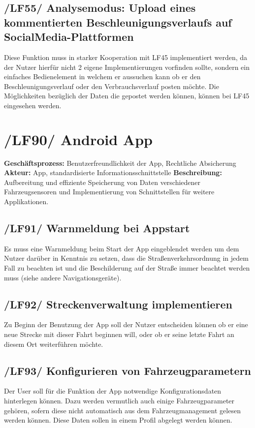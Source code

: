 \subsection{/LF55/ Analysemodus: Upload eines kommentierten Beschleunigungsverlaufs auf SocialMedia-Plattformen}
\newline
Diese Funktion muss in starker Kooperation mit LF45 implementiert werden, da der Nutzer hierfür nicht 2 eigene Implementierungen vorfinden sollte, sondern ein einfaches Bedienelement in welchem er aussuchen kann ob er den Beschleunigungsverlauf oder den Verbrauchsverlauf posten möchte. Die Möglichkeiten bezüglich der Daten die gepostet werden können, können bei LF45 eingesehen werden.

\newpage
\section{/LF90/ Android App}
\textbf{Geschäftsprozess:}	Benutzerfreundlichkeit der App, Rechtliche Absicherung
\newline
\textbf{Akteur:}		App, standardisierte Informationsschnittstelle
\newline
\textbf{Beschreibung:} Aufbereitung und effiziente Speicherung von Daten verschiedener Fahrzeugsensoren und Implementierung von Schnittstellen für weitere Applikationen. 

\subsection{/LF91/ Warnmeldung bei Appstart}
\newline
Es muss eine Warnmeldung beim Start der App eingeblendet werden um dem Nutzer darüber in Kenntnis zu setzen, dass die Straßenverkehrsordnung in jedem Fall zu beachten ist und die Beschilderung auf der Straße immer beachtet werden muss (siehe andere Navigationsgeräte).

\subsection{/LF92/ Streckenverwaltung implementieren}
\newline
Zu Beginn der Benutzung der App soll der Nutzer entscheiden können ob er eine neue Strecke mit dieser Fahrt beginnen will, oder ob er seine letzte Fahrt an diesem Ort weiterführen möchte.

\subsection{/LF93/ Konfigurieren von Fahrzeugparametern}
\newline
Der User soll für die Funktion der App notwendige Konfigurationsdaten hinterlegen können. Dazu werden vermutlich auch einige Fahrzeugparameter gehören, sofern diese nicht automatisch aus dem Fahrzeugmanagement gelesen werden können. Diese Daten sollen in einem Profil abgelegt werden können.

